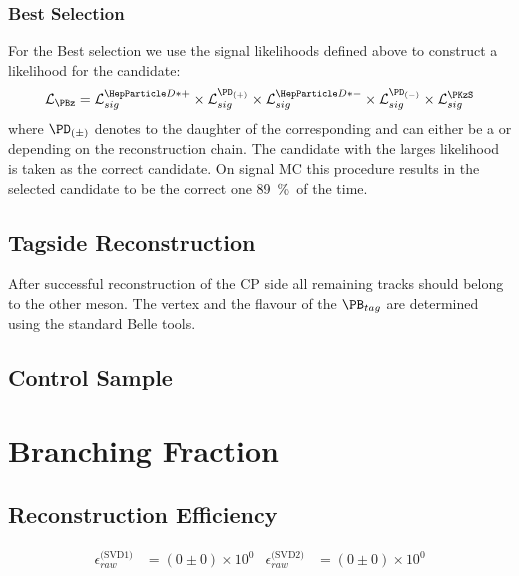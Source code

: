 \documentclass[a4paper]{report}
\def\BestBSelectionEff{\SI{89}{\%}}
\def\RawReconstructionEffSVDOne{(0 \pm 0)\times 10^0}
\def\RawReconstructionEffSVDTwo{(0 \pm 0)\times 10^0}
\begin{document}

\subsection{Best \texorpdfstring{\PB}{B} Selection}
\label{sec:bestB}
For the Best \PB selection we use the signal likelihoods defined above to
construct a likelihood for the \PB candidate:
\[
\LH_{\PBz} = \LH_{sig}^{\PDstp} \times \LH_{sig}^{\PD_{(+)}} \times \LH_{sig}^{\PDstm} \times
\LH_{sig}^{\PD_{(-)}} \times \LH_{sig}^{\PKzS}
\]
where $\PD_{(\pm)}$ denotes to the daughter \PD of the corresponding \PDstpm and
can either be a \PDz or \PDpm depending on the reconstruction chain. The \PB
candidate with the larges likelihood is taken as the correct \PB candidate. On
signal MC this procedure results in the selected \PB candidate to be the correct
one \BestBSelectionEff\ of the time.


\section{Tagside Reconstruction}

After successful reconstruction of the CP side all remaining tracks should
belong to the other \PB meson. The vertex and the flavour of the $\PB_{tag}$ are
determined using the standard Belle tools.

\section{Control Sample}

\chapter{Branching Fraction}

\section{Reconstruction Efficiency}

\begin{align}
    \epsilon_{raw}^{\text{(SVD1)}} & = \RawReconstructionEffSVDOne &
    \epsilon_{raw}^{\text{(SVD2)}} & = \RawReconstructionEffSVDTwo
\end{align}
\end{document}
